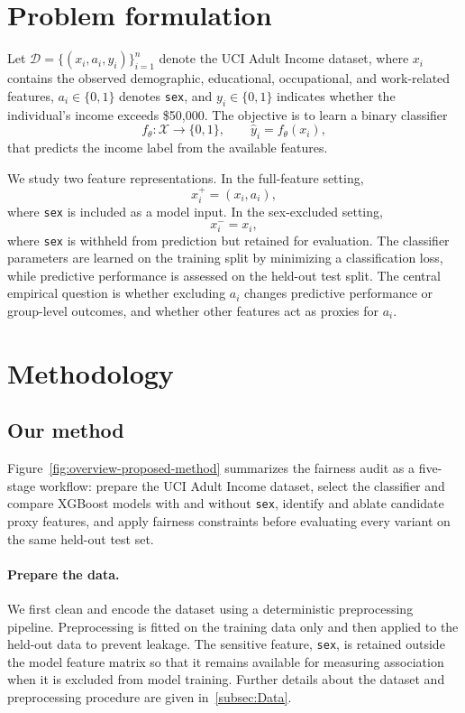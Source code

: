\documentclass{article}
\begin{document}
\section{Problem formulation}\label{sec:problem-formulation}

Let $\mathcal{D}=\{(x_i,a_i,y_i)\}_{i=1}^{n}$ denote the UCI Adult Income dataset,
where $x_i$ contains the observed demographic, educational, occupational, and
work-related features, $a_i\in\{0,1\}$ denotes \texttt{sex}, and
$y_i\in\{0,1\}$ indicates whether the individual's income exceeds \$50{,}000.
The objective is to learn a binary classifier
\[
f_\theta:\mathcal{X}\rightarrow\{0,1\},
\qquad
\hat{y}_i=f_\theta(x_i),
\]
that predicts the income label from the available features.

We study two feature representations. In the full-feature setting,
\[
x_i^{+}=(x_i,a_i),
\]
where \texttt{sex} is included as a model input. In the sex-excluded setting,
\[
x_i^{-}=x_i,
\]
where \texttt{sex} is withheld from prediction but retained for evaluation.
The classifier parameters are learned on the training split by minimizing a
classification loss, while predictive performance is assessed on the held-out
test split. The central empirical question is whether excluding $a_i$ changes predictive
performance or group-level outcomes, and whether other features act as
proxies for $a_i$.


\section{Methodology}\label{sec:methodology}
\subsection{Our method}
Figure~\ref{fig:overview-proposed-method} summarizes the fairness
audit as a five-stage workflow: prepare the UCI Adult Income dataset, select
the classifier and compare XGBoost models with and without \texttt{sex},
identify and ablate candidate proxy features, and apply fairness constraints
before evaluating every variant on the same held-out test set.

\paragraph{Prepare the data.}
We first clean and encode the dataset using a deterministic preprocessing
pipeline. Preprocessing is fitted on the training data only and then applied
to the held-out data to prevent leakage. The sensitive feature,
\texttt{sex}, is retained outside the model feature matrix so that it remains
available for measuring association when it is excluded from model training.
Further details about the dataset and preprocessing procedure are given in~\ref{subsec:Data}.
\end{document}
